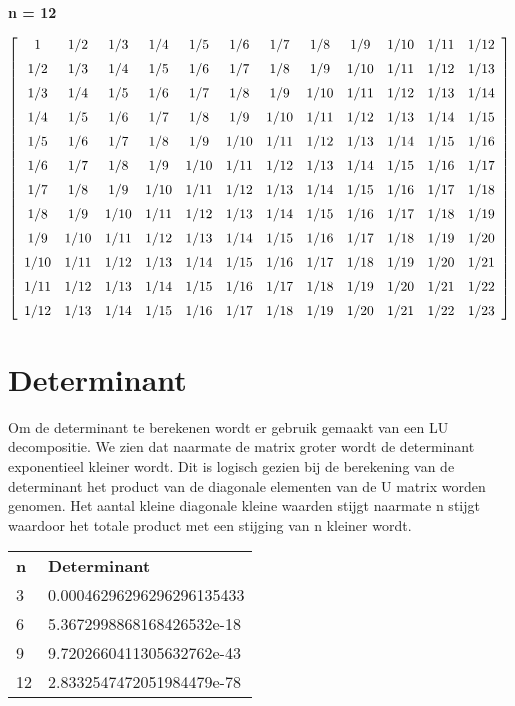 \documentclass[10pt,a4paper]{article}
\begin{document}
\begin{center}
\textbf{n = 12}
\end{center}
$$  \left[ \begin {array}{cccccccccccc} 1&1/2&1/3&1/4&1/5&1/6&1/7&1/8&1/9
&1/10&1/11&1/12\\ \noalign{\medskip}1/2&1/3&1/4&1/5&1/6&1/7&1/8&1/9&1/
10&1/11&1/12&1/13\\ \noalign{\medskip}1/3&1/4&1/5&1/6&1/7&1/8&1/9&1/10
&1/11&1/12&1/13&1/14\\ \noalign{\medskip}1/4&1/5&1/6&1/7&1/8&1/9&1/10&
1/11&1/12&1/13&1/14&1/15\\ \noalign{\medskip}1/5&1/6&1/7&1/8&1/9&1/10&
1/11&1/12&1/13&1/14&1/15&1/16\\ \noalign{\medskip}1/6&1/7&1/8&1/9&1/10
&1/11&1/12&1/13&1/14&1/15&1/16&1/17\\ \noalign{\medskip}1/7&1/8&1/9&1/
10&1/11&1/12&1/13&1/14&1/15&1/16&1/17&1/18\\ \noalign{\medskip}1/8&1/9
&1/10&1/11&1/12&1/13&1/14&1/15&1/16&1/17&1/18&1/19
\\ \noalign{\medskip}1/9&1/10&1/11&1/12&1/13&1/14&1/15&1/16&1/17&1/18&
1/19&1/20\\ \noalign{\medskip}1/10&1/11&1/12&1/13&1/14&1/15&1/16&1/17&
1/18&1/19&1/20&1/21\\ \noalign{\medskip}1/11&1/12&1/13&1/14&1/15&1/16&
1/17&1/18&1/19&1/20&1/21&1/22\\ \noalign{\medskip}1/12&1/13&1/14&1/15&
1/16&1/17&1/18&1/19&1/20&1/21&1/22&1/23\end {array} \right] 
$$
\section{Determinant}
Om de determinant te berekenen wordt er gebruik gemaakt van een LU decompositie. We zien dat naarmate de matrix groter wordt de determinant exponentieel kleiner wordt. Dit is logisch gezien bij de berekening van de determinant het product van de diagonale elementen van de U matrix worden genomen. Het aantal kleine diagonale kleine waarden stijgt naarmate n stijgt waardoor het totale product met een stijging van n kleiner wordt.
\begin{center}
\begin{tabular}{ll}
\textbf{n} & \textbf{Determinant} \\
3          & 0.00046296296296296135433            \\
6          & 5.3672998868168426532e-18            \\
9          & 9.7202660411305632762e-43             \\
12         & 2.8332547472051984479e-78           
\end{tabular}
\end{center}
\end{document}
